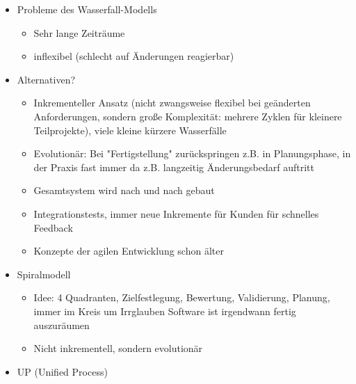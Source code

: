 \documentclass[paper=a4, fontsize=11pt]{scrartcl} %
\numberwithin{equation}{section} %
\numberwithin{figure}{section} %
\numberwithin{table}{section} %
\begin{document}
\begin{itemize}
\begin{itemize}
  \end{itemize}
  \item Probleme des Wasserfall-Modells
  \begin{itemize}
    \item Sehr lange Zeiträume
    \item inflexibel (schlecht auf Änderungen reagierbar)
  \end{itemize}
  \item Alternativen?
  \begin{itemize}
    \item Inkrementeller Ansatz (nicht zwangsweise flexibel bei geänderten Anforderungen, sondern große Komplexität: mehrere Zyklen für kleinere Teilprojekte), viele kleine kürzere Wasserfälle
    \item Evolutionär: Bei "Fertigstellung" zurückspringen z.B. in Planungsphase, in der Praxis fast immer da z.B. langzeitig Änderungsbedarf auftritt
    \item Gesamtsystem wird nach und nach gebaut
    \item Integrationstests, immer neue Inkremente für Kunden für schnelles Feedback
    \item Konzepte der agilen Entwicklung schon älter
  \end{itemize}
  \item Spiralmodell
  \begin{itemize}
    \item Idee: 4 Quadranten, Zielfestlegung, Bewertung, Validierung, Planung, immer im Kreis um Irrglauben Software ist irgendwann fertig auszuräumen
    \item Nicht inkrementell, sondern evolutionär
  \end{itemize}
  \item UP (Unified Process)\\
\end{itemize}
\end{document}
